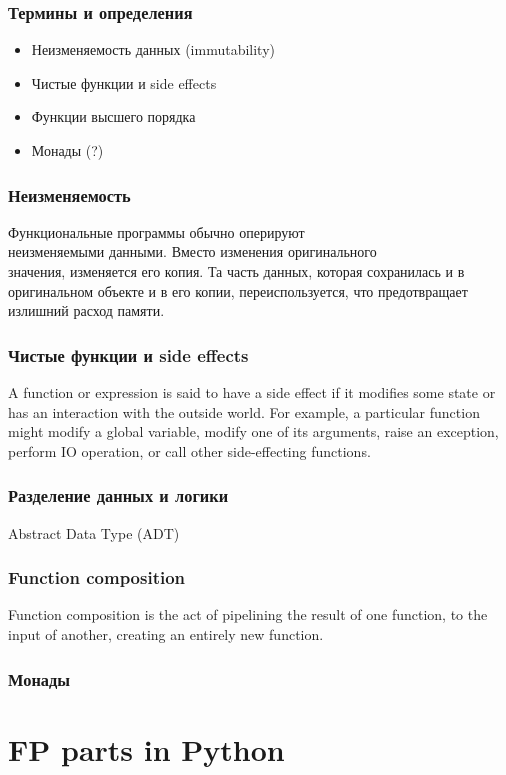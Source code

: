 \documentclass[14pt, compress, aspectratio=169]{beamer}
\begin{document}
\begin{frame}[fragile]
    \frametitle{Термины и определения}
    \begin{itemize}[label={\MVRightarrow}]
        \item Неизменяемость данных (immutability)
        \item Чистые функции и side effects
        \item Функции высшего порядка
        \item Монады (?)
    \end{itemize}
\end{frame}

\begin{frame}
    \frametitle{Неизменяемость}
    Функциональные программы обычно оперируют \\
    неизменяемыми данными. Вместо изменения оригинального\\
    значения, изменяется его копия. Та часть данных,
    которая сохранилась и в оригинальном объекте и в его копии,
    переиспользуется, что предотвращает излишний расход памяти.
\end{frame}

\begin{frame}
    \frametitle{Чистые функции и side effects}
    A function or expression is said to have a side effect if it modifies some
    state or has an interaction with the outside world. For example, a
    particular function might modify a global variable, modify one of its
    arguments, raise an exception, perform IO operation, or call other
    side-effecting functions.
\end{frame}

\begin{frame}
    \frametitle{Разделение данных и логики}
    Abstract Data Type (ADT)
\end{frame}

\begin{frame}
    \frametitle{Function composition}
    Function composition is the act of pipelining the result of one function,
    to the input of another, creating an entirely new function.
\end{frame}

\begin{frame}
    \frametitle{Монады}
\end{frame}

\section{FP parts in Python}
\end{document}
